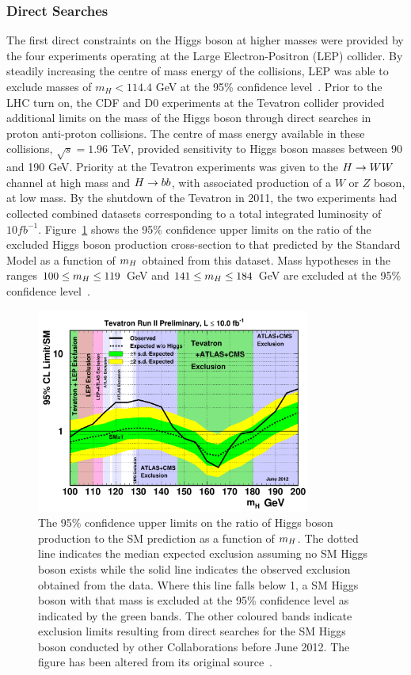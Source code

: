 \subsubsection{Direct Searches}
The first direct constraints on the Higgs boson at higher masses 
were provided by the four experiments operating at the 
Large Electron-Positron (LEP) collider. By steadily increasing the centre of mass 
energy of the collisions, LEP was able to exclude masses of $m_{H} <114.4$ GeV at the 
95\% confidence level~\cite{lephiggs}. Prior to the LHC turn on, 
the CDF and D0 experiments at the Tevatron collider
provided additional limits on the mass of the Higgs boson through direct 
searches in proton anti-proton collisions. 
The centre of mass energy available in these collisions, $\sqrt{s}=1.96$ TeV, 
provided sensitivity to Higgs boson masses between 90 and 190 GeV. 
Priority at the Tevatron experiments was given to the $H\rightarrow WW$ channel at high mass
and $H\rightarrow bb$, with associated production of a $W$ or $Z$ boson, at low mass.
By the shutdown of the Tevatron in 2011, the two experiments had collected combined 
datasets corresponding to a total integrated luminosity of $10fb^{-1}$. 
Figure~\ref{fig:tevatronlims} shows the 95\% confidence upper limits on the 
ratio of the excluded Higgs boson production cross-section to that predicted 
by the Standard Model as a function of $m_{H}$ obtained from this dataset. 
Mass hypotheses in the ranges $100\le m_{H}\le119 $ GeV and $141 \le m_{H} \le 184$ GeV
are excluded at the 95\% confidence level~\citep{tevhiggscombinations}.
\begin{figure}
\begin{center}
\includegraphics[width=0.8\textwidth]{theory/pheno/tevsmbayes_june2012_withleplhc.pdf}
\caption{The 95\% confidence upper limits on the ratio of Higgs boson production to the SM prediction
as a function of $m_{H}$.
The dotted line indicates the median expected exclusion assuming no
SM Higgs boson exists while the solid line indicates the observed exclusion obtained 
from the data. Where this line falls below 1, a SM Higgs boson with that mass is excluded at the
95\% confidence level as indicated by the green bands. The other coloured bands indicate 
exclusion limits resulting from direct searches for the SM Higgs boson conducted by other
Collaborations before June 2012. The figure has been altered from its original 
source~\cite{tevhiggscombinations}.}
\label{fig:tevatronlims}
\end{center}
\end{figure}

